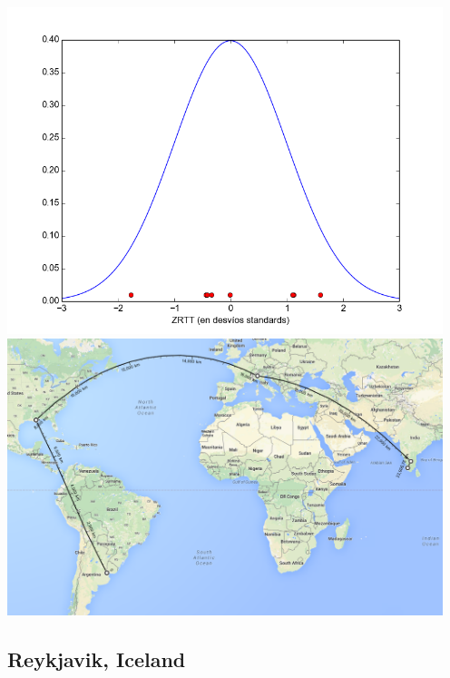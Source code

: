 \includegraphics[width=5in]{imgs/cusat_dist.png}
 \includegraphics[width=5in]{imgs/maps/cusat.png}

\subsection{Reykjavik, Iceland}

